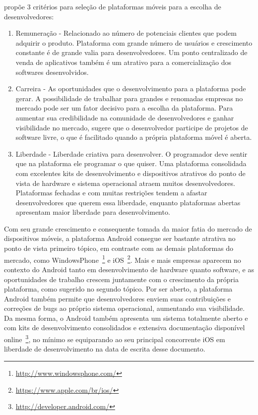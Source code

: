  propõe 3 critérios para seleção de plataformas móveis para a escolha de desenvolvedores:
\begin{enumerate}
\item Remuneração - Relacionado ao número de potenciais clientes que podem adquirir o produto. Plataforma com grande número de usuários e crescimento constante é de grande valia para desenvolvedores. Um ponto centralizado de venda de aplicativos também é um atrativo para a comercialização dos softwares desenvolvidos.
\item Carreira - As oportunidades que o desenvolvimento para a plataforma pode gerar. A possibilidade de trabalhar para grandes e renomadas empresas no mercado pode ser um fator decisivo para a escolha da plataforma. Para aumentar sua credibilidade na comunidade de desenvolvedores e ganhar visibilidade no mercado,  sugere que o desenvolvedor participe de projetos de software livre, o que é facilitado quando a própria plataforma móvel é aberta.
\item Liberdade - Liberdade criativa para desenvolver. O programador deve sentir que na plataforma ele programar o que quiser. Uma plataforma consolidada com excelentes kits de desenvolvimento e dispositivos atrativos do ponto de vista de hardware e sistema operacional atraem muitos desenvolvedores. Plataformas fechadas e com muitas restrições tendem a afastar desenvolvedores que querem essa liberdade, enquanto plataformas abertas apresentam maior liberdade para desenvolvimento.
\end{enumerate}

Com seu grande crescimento e consequente tomada da maior fatia do mercado de dispositivos móveis, a plataforma Android consegue ser bastante atrativa no ponto de vista primeiro tópico, em contraste com as demais plataformas do mercado, como WindowsPhone~\footnote{\url{http://www.windowsphone.com/}} e iOS~\footnote{\url{https://www.apple.com/br/ios/}}. Mais e mais empresas aparecem no contexto do Android tanto em desenvolvimento de hardware quanto software, e as oportunidades de trabalho crescem juntamente com o crescimento da própria plataforma, como sugerido no segundo tópico. Por ser aberto, a plataforma Android também permite que desenvolvedores enviem suas contribuições e correções de bugs ao próprio sistema operacional, aumentando sua visibilidade. Da mesma forma, o Android também apresenta um sistema totalmente aberto e com kits de desenvolvimento consolidados e extensiva documentação disponível online~\footnote{\url{http://developer.android.com/}}, no mínimo se equiparando ao seu principal concorrente iOS em liberdade de desenvolvimento na data de escrita desse documento.


